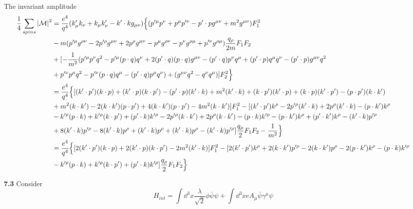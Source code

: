 \documentclass{article}
\newcommand{\gm}{\gamma^{\mu}} \newcommand{\gn}{\gamma^{\nu}}
\newcommand{\la}{\lambda} \newcommand{\p}{\phi} \newcommand{\vp}{\varphi}
\begin{document}
The invariant amplitude
\begin{align*}
  \frac{1}{4}\sum_{spins}\abs{\mathcal{M}}^2&=\frac{e^4}{q^4}(k'_{\mu}k_{\nu}+k_{\mu}k'_{\nu}-k'\cdot kg_{\mu\nu})\Big\{(p'^{\mu}p^{\nu}+p^{\mu}p'^{\nu}-p'\cdot pg^{\mu\nu}+m^2g^{\mu\nu})F_1^2\\
  &-m(p'^{\mu}g^{\rho\nu}-2p'^{\rho}g^{\mu\nu}+2p^{\rho}g^{\mu\nu}-p^{\mu}g^{\rho\nu}-p^{\nu}g^{\rho\mu}+p'^{\nu}g^{\rho\mu})\frac{q_{\rho}}{2m}F_1F_2\\&+[-\frac{1}{m^2}(p'^{\mu}p^{\nu}q^2-p'^{\mu}(p\cdot q)q^{\nu}+2(p'\cdot q)(p\cdot q)g^{{\mu}{\nu}}-(p'\cdot q)p^{\nu}q^{\mu}+(p'\cdot p)q^{\mu}q^{\nu}-(p'\cdot p)g^{{\mu}{\nu}}q^2\\&+p'^{\nu}p^{\mu}q^2-p'^{\nu}(p\cdot q)q^{\mu}-(p'\cdot q)p^{\mu}q^{\nu})+(g^{\mu\nu}q^2-q^{\nu}q^{\mu})]F_2^2\Big\}\\
  &=\frac{e^4}{q^4}\Big\{ [(k'\cdot p')(k\cdot p)+(k'\cdot p)(k\cdot p')-(p'\cdot p)(k'\cdot k)+m^2(k'\cdot k)+(k\cdot p')(k'\cdot p)+(k\cdot p)(k'\cdot p')-(p\cdot p')(k\cdot k')\\&+m^2(k\cdot k')-2(k\cdot k')(p\cdot p')+4(k\cdot k')(p\cdot p')-4m^2(k\cdot k')]F_1^2-[(k'\cdot p')k^{\rho}-2p'^{\rho}(k'\cdot k)+2p^{\rho}(k'\cdot k)-(p\cdot k')k^{\rho}\\
  &-k'^{\rho}(p\cdot k)+k'^{\rho}(k\cdot p')+(p'\cdot k)k'^{\rho}-2p'^{\rho}(k\cdot k')+2p^{\rho}(k\cdot k')-(p\cdot k)k'^{\rho}-(p\cdot k')k^{\rho}+(p'\cdot k')k^{\rho}-(k'\cdot k)p'^{\rho}\\
  &+8(k'\cdot k)p'^{\rho}-8(k'\cdot k)p^{\rho}+(k'\cdot k)p^{\rho}+(k'\cdot k)p^{\rho}-(k'\cdot k)p'^{\rho}]\frac{q_{\rho}}{2}F_1F_2-\frac{1}{m^2}   \Big\}\\
  &=\frac{e^4}{q^4}\Big\{ [2(k'\cdot p')(k\cdot p)+2(k'\cdot p)(k\cdot p')-2m^2(k'\cdot k)]F_1^2-[2(k'\cdot p')k^{\rho}+2(k\cdot k')p'^{\rho}-2(k\cdot k')p^{\rho}-2(p\cdot k' )k^{\rho}-(p\cdot k)k'^{\rho}\\
  &-k'^{\rho}(p\cdot k)+k'^{\rho}(k\cdot p')+(p'\cdot k)k'^{\rho}]\frac{q_{\rho}}{2}F_1F_2   \Big\}
\end{align*}

{\bf7.3}\quad
Consider
$$H_{int}=\int\dd^3x\frac{\la}{\sqrt{2}} \phi\bar\psi\psi+\int\dd^3xeA_{\mu}\bar\psi\gm\psi$$
\end{document}
